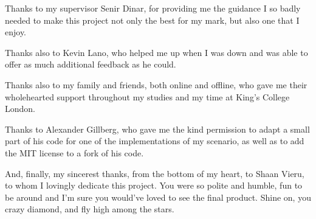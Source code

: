 
Thanks to my supervisor Senir Dinar, for providing me the guidance I so badly needed to make this project not only the best for my mark, but also one that I enjoy.

Thanks also to Kevin Lano, who helped me up when I was down and was able to offer as much additional feedback as he could.

Thanks also to my family and friends, both online and offline, who gave me their wholehearted support throughout my studies and my time at King's College London.

Thanks to Alexander Gillberg, who gave me the kind permission to adapt a small part of his code for one of the implementations of my scenario, as well as to add the MIT license to a fork of his code.

And, finally, my sincerest thanks, from the bottom of my heart, to Shaan Vieru, to whom I lovingly dedicate this project. You were so polite and humble, fun to be around and I'm sure you would've loved to see the final product. Shine on, you crazy diamond, and fly high among the stars.